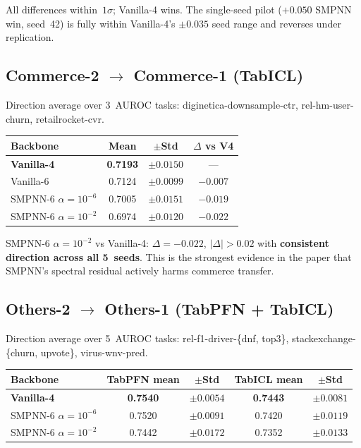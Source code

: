 \documentclass{article}
\begin{document}
All differences within~$1\sigma$; Vanilla-4 wins. The single-seed pilot ($+0.050$ SMPNN win, seed~42) is fully within Vanilla-4's $\pm 0.035$ seed range and reverses under replication.

\subsection{Commerce-2 $\to$ Commerce-1 (TabICL)}
Direction average over 3~AUROC tasks: diginetica-downsample-ctr, rel-hm-user-churn, retailrocket-cvr.

\begin{table}[h]
  \centering
  \small
  \begin{tabular}{@{}lccc@{}}
    \toprule
    Backbone                        & Mean   & $\pm$Std   & $\Delta$ vs V4 \\
    \midrule
    \textbf{Vanilla-4}              & \textbf{0.7193} & $\pm 0.0150$ & ---        \\
    Vanilla-6                       & 0.7124 & $\pm 0.0099$ & $-0.007$   \\
    SMPNN-6 $\alpha{=}10^{-6}$      & 0.7005 & $\pm 0.0151$ & $-0.019$   \\
    SMPNN-6 $\alpha{=}10^{-2}$      & 0.6974 & $\pm 0.0120$ & $-0.022$   \\
    \bottomrule
  \end{tabular}
\end{table}

SMPNN-6 $\alpha{=}10^{-2}$ vs Vanilla-4: $\Delta = -0.022$, $|\Delta| > 0.02$ with \textbf{consistent direction across all 5~seeds}. This is the strongest evidence in the paper that SMPNN's spectral residual actively harms commerce transfer.

\subsection{Others-2 $\to$ Others-1 (TabPFN + TabICL)}
Direction average over 5~AUROC tasks: rel-f1-driver-\{dnf, top3\}, stackexchange-\{churn, upvote\}, virus-wnv-pred.

\begin{table}[h]
  \centering
  \small
  \begin{tabular}{@{}lcccc@{}}
    \toprule
    Backbone                    & TabPFN mean & $\pm$Std & TabICL mean & $\pm$Std \\
    \midrule
    \textbf{Vanilla-4}          & \textbf{0.7540} & $\pm 0.0054$ & \textbf{0.7443} & $\pm 0.0081$ \\
    SMPNN-6 $\alpha{=}10^{-6}$  & 0.7520 & $\pm 0.0091$ & 0.7420 & $\pm 0.0119$ \\
    SMPNN-6 $\alpha{=}10^{-2}$  & 0.7442 & $\pm 0.0172$ & 0.7352 & $\pm 0.0133$ \\
    \bottomrule
  \end{tabular}
\end{table}
\end{document}
